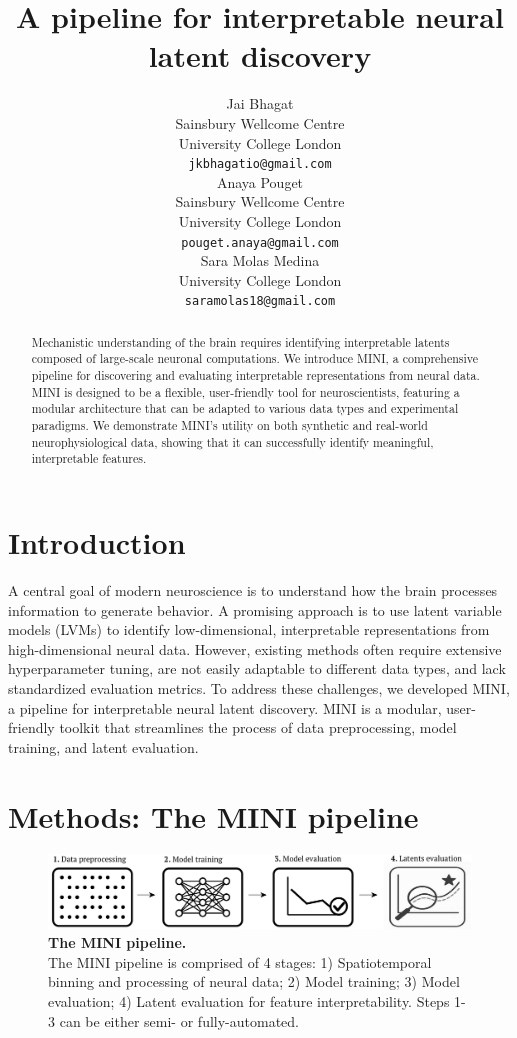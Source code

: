 \documentclass{article}
\title{A pipeline for interpretable neural latent discovery}
\author{
  Jai Bhagat \\
  Sainsbury Wellcome Centre \\
  University College London \\
  \texttt{jkbhagatio@gmail.com} \\
  \And
  Anaya Pouget \\
  Sainsbury Wellcome Centre \\
  University College London \\
  \texttt{pouget.anaya@gmail.com} \\
  \And
  Sara Molas Medina \\
  University College London \\
  \texttt{saramolas18@gmail.com} \\
}
\begin{document}
\maketitle

\begin{abstract}
Mechanistic understanding of the brain requires identifying interpretable latents composed of large-scale neuronal computations. We introduce MINI, a comprehensive pipeline for discovering and evaluating interpretable representations from neural data. MINI is designed to be a flexible, user-friendly tool for neuroscientists, featuring a modular architecture that can be adapted to various data types and experimental paradigms. We demonstrate MINI's utility on both synthetic and real-world neurophysiological data, showing that it can successfully identify meaningful, interpretable features.
\end{abstract}

\section{Introduction}

A central goal of modern neuroscience is to understand how the brain processes information to generate behavior. A promising approach is to use latent variable models (LVMs) to identify low-dimensional, interpretable representations from high-dimensional neural data. However, existing methods often require extensive hyperparameter tuning, are not easily adaptable to different data types, and lack standardized evaluation metrics. To address these challenges, we developed MINI, a pipeline for interpretable neural latent discovery. MINI is a modular, user-friendly toolkit that streamlines the process of data preprocessing, model training, and latent evaluation.

\section{Methods: The MINI pipeline}

\begin{figure}[h]
    \centering
    \includegraphics[width=\linewidth]{figures/mini_pipeline.pdf}
    \caption{
        \textbf{The MINI pipeline.} \\
        \small The MINI pipeline is comprised of 4 stages: 1) Spatiotemporal binning and processing of neural data; 2) Model training; 3) Model evaluation; 4) Latent evaluation for feature interpretability. Steps 1-3 can be either semi- or fully-automated.
    }
    \label{figure:mini_pipeline}
\end{figure}
\end{document}

